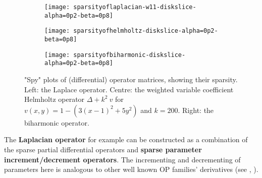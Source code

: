 \documentclass{imposter}
\begin{document}
{\begin{wrapfigure}{R}{0.7\textwidth}
	\centering
	\begin{subfigure}{0.2\textwidth}
	\centering
	\texttt{[image: sparsityoflaplacian-w11-diskslice-alpha=0p2-beta=0p8]}
        \centering
	\end{subfigure}
	\begin{subfigure}{0.2\textwidth}
	\texttt{[image: sparsityofhelmholtz-diskslice-alpha=0p2-beta=0p8]}
        \centering
	\end{subfigure}
	\begin{subfigure}{0.2\textwidth}
	\texttt{[image: sparsityofbiharmonic-diskslice-alpha=0p2-beta=0p8]}
        \centering
	\end{subfigure}
	\captionsetup{width=.8\linewidth}
    	\caption{"Spy" plots of (differential) operator matrices, showing their sparsity. Left: the Laplace operator. Centre: the weighted variable coefficient Helmholtz operator $\Delta + k^2 \: v$ for $v(x,y) = 1 - (3(x-1)^2 + 5y^2)$ and $k = 200$. Right: the biharmonic operator.}
        \label{fig:sparsity}
        \centering
\end{wrapfigure}

The \textbf{Laplacian operator} for example can be constructed as a combination of the sparse partial differential operators and \textbf{sparse parameter increment/decrement operators}. The incrementing and decrementing of parameters here is analogous to other well known OP families' derivatives (see \cite[(18.9.3)]{DLMF}, \cite{olver2018recurrence}).

}
\end{document}
